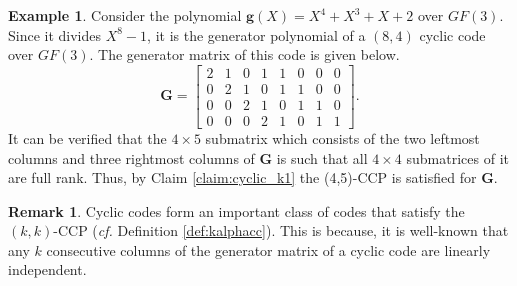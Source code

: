 \documentclass[journal,twocolumn]{IEEEtran}
\theoremstyle{definition}
\newtheorem{claim}{Claim}
\newtheorem{example}{Example}
\newtheorem{remark}{Remark}
\newcommand{\calS}{\mathcal{S}}
\newcommand{\bfg}{\mathbf{g}}
\newcommand{\bfG}{\mathbf{G}}
\newcommand{\aditya}[1]{\marginpar{+}{\bf Aditya's remark}: {\em #1}}
\newcommand{\litang}[1]{\marginpar{+}{\bf Li's remark}: {\em #1}}
\begin{document}
\begin{example}
	Consider the polynomial $\bfg(X)=X^4+X^3+X+2$ over $GF(3)$. Since it divides $X^8-1$, it is the generator polynomial of a $(8,4)$ cyclic code over $GF(3)$. The generator matrix of this code is given below.
	$$\bfG=
	\begin{bmatrix}
	2&1&0&1&1&0&0&0\\
	0&2&1&0&1&1&0&0\\
	0&0&2&1&0&1&1&0\\
	0&0&0&2&1&0&1&1
	\end{bmatrix}.
	$$
	It can be verified that the $4\times 5$ submatrix which consists of the two leftmost columns and three rightmost columns of $\bfG$ is such that all $4 \times 4$ submatrices of it are full rank. Thus, by Claim \ref{claim:cyclic_k1} the (4,5)-CCP is satisfied for $\bfG$.
\end{example}
\begin{remark}
Cyclic codes form an important class of codes that satisfy the $(k,k)$-CCP ({\it cf.} Definition \ref{def:kalphacc}). This is because, it is well-known \cite{lincostello} that any $k$ consecutive columns of the generator matrix of a cyclic code are linearly independent. %
\end{remark}
%
%
\end{document}
